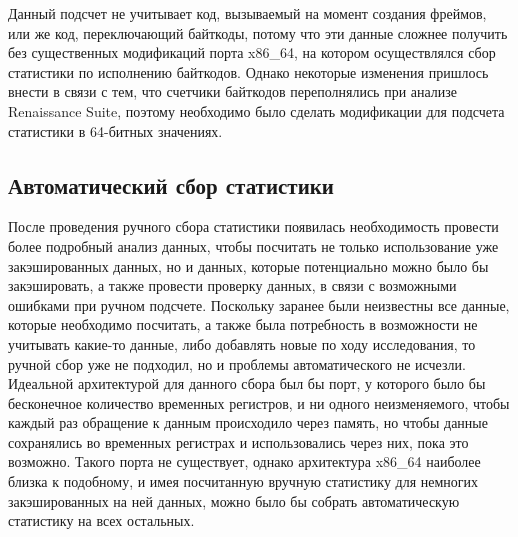 Данный подсчет не учитывает код, вызываемый на момент создания фреймов, или же код, переключающий байткоды, потому что эти данные сложнее получить без существенных модификаций порта x86\_64, на котором осуществлялся сбор статистики по исполнению байткодов. Однако некоторые изменения пришлось внести в связи с тем, что счетчики байткодов переполнялись при анализе Renaissance Suite, поэтому необходимо было сделать модификации для подсчета статистики в 64-битных значениях.



\subsection{Автоматический сбор статистики}

После проведения ручного сбора статистики появилась необходимость провести более подробный анализ данных, чтобы посчитать не только использование уже закэшированных данных, но и данных, которые потенциально можно было бы закэшировать, а также провести проверку данных, в связи с возможными ошибками при ручном подсчете. Поскольку заранее были неизвестны все данные, которые необходимо посчитать, а также была потребность в возможности не учитывать какие-то данные, либо добавлять новые по ходу исследования, то ручной сбор уже не подходил, но и проблемы автоматического не исчезли. Идеальной архитектурой для данного сбора был бы порт, у которого было бы бесконечное количество временных регистров, и ни одного неизменяемого, чтобы каждый раз обращение к данным происходило через память, но чтобы данные сохранялись во временных регистрах и использовались через них, пока это возможно. Такого порта не существует, однако архитектура x86\_64 наиболее близка к подобному, и имея посчитанную вручную статистику для немногих закэшированных на ней данных, можно было бы собрать автоматическую статистику на всех остальных. 

